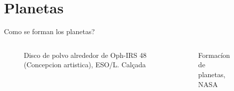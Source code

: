 \documentclass[xetex,aspectratio=169]{beamer}
\begin{document}
	\section{Planetas}
	\begin{frame}{Como se forman los planetas?}
		\begin{columns}
			\begin{column}{0.48\textwidth}
				\begin{figure}
					\caption*{Disco de polvo alrededor de Oph-IRS 48 (Concepcion artistica), ESO/L. Calçada}
				\end{figure}
			\end{column}
			
			\begin{column}{0.48\textwidth}
				\begin{figure}
					\caption*{Formacíon de planetas, NASA}
				\end{figure}			
			\end{column}
		\end{columns}
		
	\end{frame}
\end{document}

